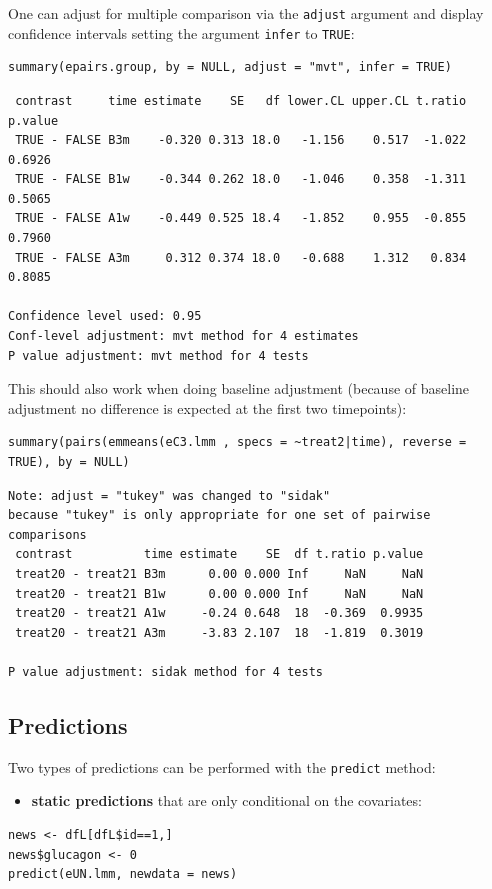 \documentclass[12pt]{article}
\begin{document}
One can adjust for multiple comparison via the \texttt{adjust} argument and
display confidence intervals setting the argument \texttt{infer} to \texttt{TRUE}:
\lstset{language=r,label= ,caption= ,captionpos=b,numbers=none}
\begin{lstlisting}
summary(epairs.group, by = NULL, adjust = "mvt", infer = TRUE)
\end{lstlisting}

\begin{verbatim}
 contrast     time estimate    SE   df lower.CL upper.CL t.ratio p.value
 TRUE - FALSE B3m    -0.320 0.313 18.0   -1.156    0.517  -1.022  0.6926
 TRUE - FALSE B1w    -0.344 0.262 18.0   -1.046    0.358  -1.311  0.5065
 TRUE - FALSE A1w    -0.449 0.525 18.4   -1.852    0.955  -0.855  0.7960
 TRUE - FALSE A3m     0.312 0.374 18.0   -0.688    1.312   0.834  0.8085

Confidence level used: 0.95 
Conf-level adjustment: mvt method for 4 estimates 
P value adjustment: mvt method for 4 tests
\end{verbatim}


This should also work when doing baseline adjustment (because of
baseline adjustment no difference is expected at the first two
timepoints):
\lstset{language=r,label= ,caption= ,captionpos=b,numbers=none}
\begin{lstlisting}
summary(pairs(emmeans(eC3.lmm , specs = ~treat2|time), reverse = TRUE), by = NULL)
\end{lstlisting}

\begin{verbatim}
Note: adjust = "tukey" was changed to "sidak"
because "tukey" is only appropriate for one set of pairwise comparisons
 contrast          time estimate    SE  df t.ratio p.value
 treat20 - treat21 B3m      0.00 0.000 Inf     NaN     NaN
 treat20 - treat21 B1w      0.00 0.000 Inf     NaN     NaN
 treat20 - treat21 A1w     -0.24 0.648  18  -0.369  0.9935
 treat20 - treat21 A3m     -3.83 2.107  18  -1.819  0.3019

P value adjustment: sidak method for 4 tests
\end{verbatim}


\clearpage

\subsection{Predictions}
\label{sec:org50c259f}

Two types of predictions can be performed with the \texttt{predict} method:
\begin{itemize}
\item \textbf{static predictions} that are only conditional on the covariates:
\end{itemize}
\lstset{language=r,label= ,caption= ,captionpos=b,numbers=none}
\begin{lstlisting}
news <- dfL[dfL$id==1,]
news$glucagon <- 0
predict(eUN.lmm, newdata = news)
\end{lstlisting}
\end{document}
